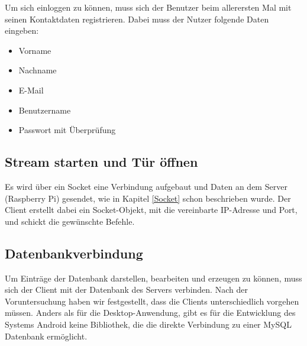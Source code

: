 Um sich einloggen zu können, muss sich der Benutzer beim allerersten Mal mit seinen Kontaktdaten registrieren. Dabei muss der Nutzer folgende Daten eingeben:

\begin{itemize}
	\item {Vorname}
	\item {Nachname}
	\item{E-Mail}
	\item{Benutzername}
	\item{Passwort mit Überprüfung}
\end{itemize}


\subsection{Stream starten und Tür öffnen}
Es wird über ein Socket eine Verbindung aufgebaut und Daten an dem Server (Raspberry Pi) gesendet, wie in Kapitel \ref{Socket} schon beschrieben wurde. Der Client erstellt dabei ein Socket-Objekt, mit die vereinbarte IP-Adresse und Port, und schickt die gewünschte Befehle.

\subsection{Datenbankverbindung}
Um Einträge der Datenbank darstellen, bearbeiten und erzeugen zu können, muss sich der Client mit der Datenbank des Servers verbinden. Nach der Voruntersuchung haben wir festgestellt, dass die Clients unterschiedlich vorgehen müssen. Anders als für die Desktop-Anwendung, gibt es für die Entwicklung des Systems Android keine Bibliothek, die die direkte Verbindung zu einer MySQL Datenbank ermöglicht.








